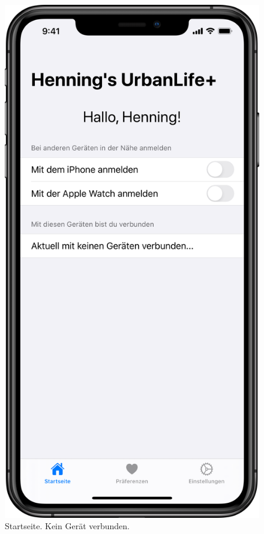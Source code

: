 \begin{minipage}{.45\textwidth}
	\begin{figure}[H]
		\centering
		\includegraphics[width=.68\textwidth]{./images/prototype/ios/home.png}
		\caption{\label{fig:app:ios:home}Startseite. Kein Gerät verbunden.}
	\end{figure}
\end{minipage}\hfill
